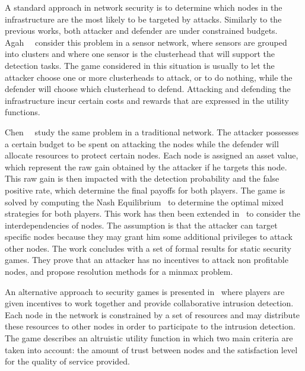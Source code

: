  A standard approach in network security is to determine which nodes in the infrastructure are the most likely to be targeted by attacks. 
 Similarly to the previous works, both attacker and defender are under constrained budgets.
 Agah~\etal~\cite{agah2004} consider this problem in a sensor network, where sensors are grouped into clusters and where one sensor is the clusterhead that will support the detection tasks.
 The game considered in this situation is usually to let the attacker choose one or more clusterheads to attack, or to do nothing, while the defender will choose which clusterhead to defend.
 Attacking and defending the infrastructure incur certain costs and rewards that are expressed in the utility functions.
 
 Chen~\etal~\cite{Chen2009} study the same problem in a traditional network. The attacker possesses a certain budget to be spent on attacking the nodes while the defender will allocate resources to protect certain nodes.
 Each node is assigned an asset value, which represent the raw gain obtained by the attacker if he targets this node.
 This raw gain is then impacted with the detection probability and the false positive rate, which determine the final payoffs for both players.
 The game is solved by computing the Nash Equilibrium~\cite{nasheq} to determine the optimal mixed strategies for both players.
 This work has then been extended in~\cite{interdep-ismail2017} to consider the interdependencies of nodes.
 The assumption is that the attacker can target specific nodes because they may grant him some additional privileges to attack other nodes.
 The work concludes with a set of formal results for static security games.
 They prove that an attacker has no incentives to attack non profitable nodes, and propose resolution methods for a minmax problem.
 
 An alternative approach to security games is presented in~\cite{Zhu2009b} where players are given incentives to work together and provide  collaborative intrusion detection.
 Each node in the network is constrained by a set of resources and may distribute these resources to other nodes in order to participate to the intrusion detection.
 The game describes an altruistic utility function in which two main criteria are taken into account: the amount of trust between nodes and the satisfaction level for the quality of service provided.

